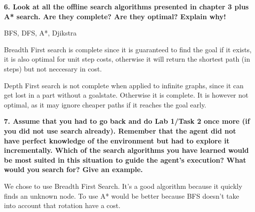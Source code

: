 \documentclass[12pt,a4paper]{article}
\begin{document}
\textbf{6. Look at all the offline search algorithms presented in chapter 3 plus A* search. Are they complete? Are they optimal? Explain why!}

BFS, DFS, A*, Djikstra

Breadth First search is complete since it is guaranteed to find the goal if it exists, it is also optimal for unit step costs, otherwise it will return the shortest path (in steps) but not neccesary in cost.

Depth First search is not complete when applied to infinite graphs, since it can get lost in a part without a goalstate. Otherwise it is complete. It is however not optimal, as it may ignore cheaper paths if it reaches the goal early.

\textbf{7. Assume that you had to go back and do Lab 1/Task 2 once more (if you did not use search already). Remember that the agent did not have perfect knowledge of the environment but had to explore it incrementally. Which of the search algorithms you have learned would be most suited in this situation to guide the agent's execution? What would you search for? Give an example.}

We chose to use Breadth First Search. It's a good algorithm because it quickly finds an unknown node. To use A* would be better because BFS doesn't take into account that rotation have a cost.
\end{document}
